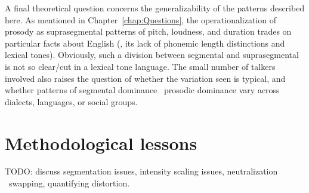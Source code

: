 A final theoretical question concerns the generalizability of the patterns described here.  As mentioned in Chapter~\ref{chap:Questions}, the operationalization of prosody as suprasegmental patterns of pitch, loudness, and duration trades on particular facts about English (\ie, its lack of phonemic length distinctions and lexical tones).  Obviously, such a division between segmental and suprasegmental is not so clear\-/cut in a lexical tone language.  The small number of talkers involved also raises the question of whether the variation seen is typical, and whether patterns of segmental dominance \vs\ prosodic dominance vary across dialects, languages, or social groups.


\section{Methodological lessons}
TODO: discuss segmentation issues, intensity scaling issues, neutralization \vs\ swapping, quantifying distortion.



